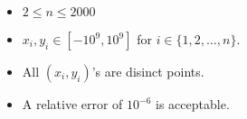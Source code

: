 \begin{itemize}
\tightlist
\item $2\le n\le 2000$
\item $x_i,y_i\in [-10^9, 10^9]$ for $i\in \{1,2,\ldots,n\}$.
\item All $(x_i,y_i)$'s are disinct points.
\item A relative error of $10^{-6}$ is acceptable.
\end{itemize}
